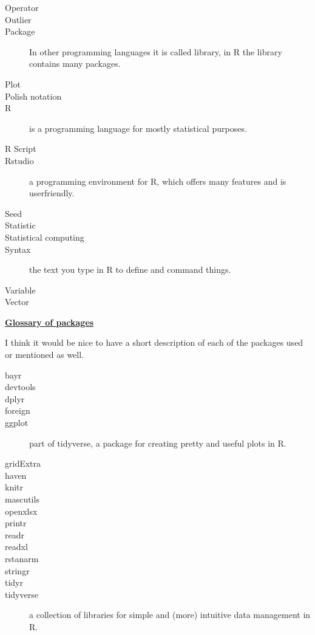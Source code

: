\documentclass{article}
\begin{document}
\begin{description}
\item [Operator]
\item [Outlier]
\item [Package] In other programming languages it is called library, in R the library contains many packages.
\item [Plot] 
\item [Polish notation]
\item [R] is a programming language for mostly statistical purposes.
\item [R Script] 
\item [Rstudio] a programming environment for R, which offers many features and is userfriendly.
\item [Seed]
\item [Statistic]
\item [Statistical computing]
\item [Syntax] the text you type in R to define and command things.
\item [Variable]
\item [Vector]

\end{description}

\noindent \underline{\textbf{Glossary of packages}}

I think it would be nice to have a short description of each of the packages used or mentioned as well. 
\begin{description}

\item [bayr]
\item [devtools]
\item [dplyr]
\item [foreign] 
\item [ggplot] part of tidyverse, a package for creating pretty and useful plots in R.
\item [gridExtra]
\item [haven]
\item [knitr]
\item [mascutils]
\item [openxlsx]
\item [printr]
\item [readr]
\item [readxl]
\item [rstanarm]
\item [stringr]
\item [tidyr]
\item [tidyverse] a collection of libraries for simple and (more) intuitive data management in R.

\end{description}
\end{document}
